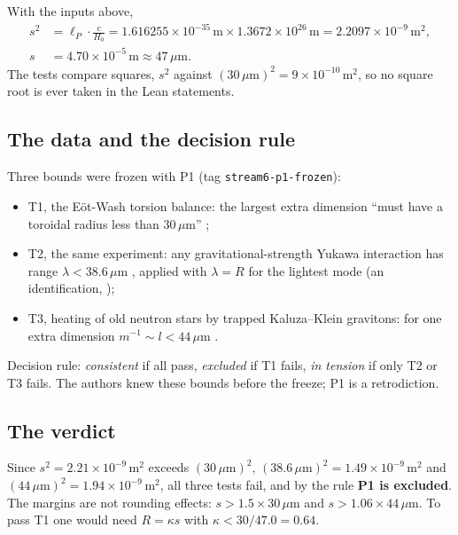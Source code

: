 \begin{example}[Computing $s$]\label{ex:verdicts:s}
With the inputs above,
\begin{align*}
 s^2&=\ell_P\cdot\frac{c}{H_0}
 =1.616255\times10^{-35}\,\text{m}\times1.3672\times10^{26}\,\text{m}
 =2.2097\times10^{-9}\,\text{m}^2,\\
 s&=4.70\times10^{-5}\,\text{m}\approx47\,\mu\text{m}.
\end{align*}
The tests compare squares, $s^2$ against $(30\,\mu\text{m})^2=9\times10^{-10}\,\text{m}^2$, so no
square root is ever taken in the Lean statements.
\end{example}

\subsection{The data and the decision rule}

Three bounds were frozen with P1 (tag \texttt{stream6-p1-frozen}):
\begin{itemize}[leftmargin=*,itemsep=1pt]
\item T1, the E\"ot-Wash torsion balance: the largest extra dimension ``must have a toroidal
 radius less than $30\,\mu$m'' ;
\item T2, the same experiment: any gravitational-strength Yukawa interaction has range
 $\lambda<38.6\,\mu$m , applied with $\lambda=R$ for the lightest mode
 (an identification, \TC);
\item T3, heating of old neutron stars by trapped Kaluza--Klein gravitons: for one extra
 dimension $m^{-1}\sim l<44\,\mu$m .
\end{itemize}
Decision rule: \emph{consistent} if all pass, \emph{excluded} if T1 fails, \emph{in tension} if
only T2 or T3 fails. The authors knew these bounds before the freeze; P1 is a retrodiction.

\subsection{The verdict}

Since $s^2=2.21\times10^{-9}\,\text{m}^2$ exceeds $(30\,\mu\text{m})^2$, $(38.6\,\mu\text{m})^2
=1.49\times10^{-9}\,\text{m}^2$ and $(44\,\mu\text{m})^2=1.94\times10^{-9}\,\text{m}^2$, all three
tests fail, and by the rule \textbf{P1 is excluded}. The margins are not rounding effects:
$s>1.5\times30\,\mu$m and $s>1.06\times44\,\mu$m. To pass T1 one would need $R=\kappa s$ with
$\kappa<30/47.0=0.64$.

